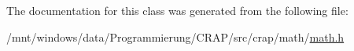 The documentation for this class was generated from the following file\-:\begin{DoxyCompactItemize}
\item 
/mnt/windows/data/\-Programmierung/\-C\-R\-A\-P/src/crap/math/\hyperlink{math_2math_8h}{math.\-h}\end{DoxyCompactItemize}
